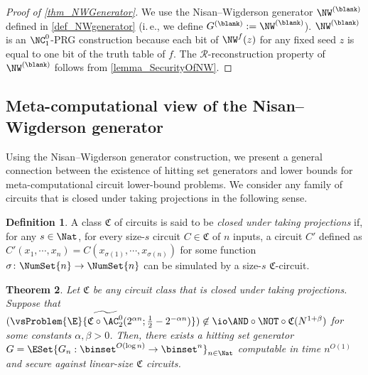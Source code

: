 \documentclass[11pt]{article}
\numberwithin{equation}{section}
\newtheorem{theorem}{Theorem}[section]
\theoremstyle{definition}
\newtheorem{definition}[theorem]{Definition}
\theoremstyle{plain}
\newcommand{\ie}{i.\,e.}
\begin{document}
\begin{proof}
  [Proof of \cref{thm_NWGenerator}]
  We use the Nisan--Wigderson generator $\NW^{(\blank)}$ defined in \cref{def_NWgenerator} (\ie, we define $G^{(\blank)} := \NW^{(\blank)}$).
  $\NW^{(\blank)}$ is an $\NC^0_1$-PRG construction because each bit of $\NW^{f}(z)$ for any fixed seed $z$
  is equal to one bit of the truth table of $f$.
  The $\mathcal{R}$-reconstruction property of $\NW^{(\blank)}$ follows from \cref{lemma_SecurityOfNW}.
\end{proof}


\subsection{Meta-computational view of the Nisan--Wigderson generator}
\label{section_GeneralNW}

Using the Nisan--Wigderson generator construction,
we present a general connection between the existence of hitting set generators
and lower bounds for meta-computational circuit lower-bound problems.
We consider any family of circuits that is closed under taking projections in the following sense.
\begin{definition}
  A class $\mathfrak{C}$ of circuits is said to be
  \emph{closed under taking projections}
  if, for any $s \in \Nat$,
  for every size-$s$ circuit $C \in \mathfrak{C}$ of $n$ inputs,
  a circuit $C'$ defined as $C'(x_1, \cdots, x_n) = C(x_{\sigma(1)}, \cdots, x_{\sigma(n)})$ for some function $\sigma \colon \NumSet{n} \to \NumSet{n}$
  can be simulated by a size-$s$ $\mathfrak{C}$-circuit.
\end{definition}

\begin{theorem}
  \label{thm_GeneralNW}
  Let $\mathfrak{C}$ be any circuit class that is closed under taking projections.
  Suppose that
  $(\vsProblem{\E}{\widetilde{\mathfrak{C} \circ \AC^0_2} (2^{\alpha n} ; \frac{1}{2} - 2^{- \alpha n})} ) \not\in \io \AND \circ \NOT \circ \mathfrak{C} (N^{1 + \beta})$
  for some constants $\alpha, \beta > 0$.
  Then,
  there exists a hitting set generator $G = \ESet{ G_n : \binset^{O(\log n)} \to \binset^n }_{n \in \Nat} $ computable in time $n^{O(1)}$ and secure against linear-size $\mathfrak{C}$ circuits.
\end{theorem}
\end{document}
